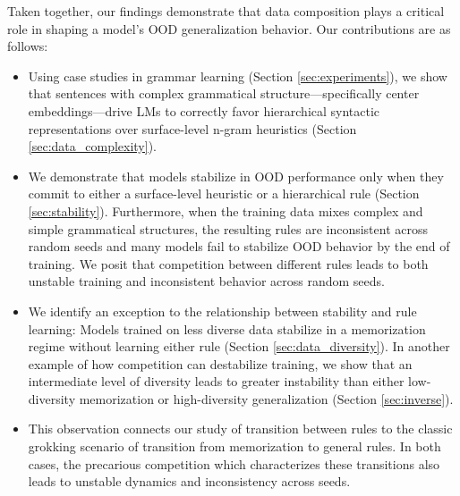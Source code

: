  
Taken together, our findings demonstrate that data composition plays a critical role in shaping a model's OOD generalization behavior. Our contributions are as follows:
\begin{itemize}[itemsep=2pt,labelindent=2pt,topsep=0pt,parsep=0pt,partopsep=1pt, align=left, leftmargin=*]
    \item Using case studies in grammar learning (Section \ref{sec:experiments}), we show that sentences with complex grammatical structure---specifically center embeddings---drive LMs to correctly favor hierarchical syntactic representations over surface-level n-gram heuristics (Section \ref{sec:data_complexity}). 
    \item We demonstrate that models stabilize in OOD performance only when they commit to either a surface-level heuristic or a hierarchical rule (Section \ref{sec:stability}). Furthermore, when the training data mixes complex and simple grammatical structures, the resulting rules are inconsistent across random seeds and many models fail to stabilize OOD behavior by the end of training. We posit that competition between different rules leads to both unstable training and inconsistent behavior across random seeds.
    \item We identify an exception to the relationship between stability and rule learning: Models trained on less diverse data stabilize in a memorization regime without learning either rule (Section \ref{sec:data_diversity}). In another example of how competition can destabilize training, we show that an intermediate level of diversity leads to greater instability than either low-diversity memorization or high-diversity generalization (Section \ref{sec:inverse}).
    \item This observation connects our study of transition between rules to the classic grokking scenario of transition from memorization to general rules. In both cases, the precarious competition which characterizes these transitions also leads to unstable dynamics and inconsistency across seeds.
\end{itemize}


